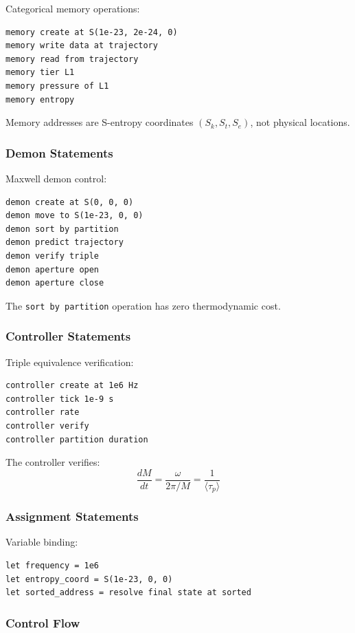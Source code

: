 \documentclass[twocolumn,10pt]{article}
\theoremstyle{definition}
\theoremstyle{remark}
\begin{document}
Categorical memory operations:
\begin{lstlisting}
memory create at S(1e-23, 2e-24, 0)
memory write data at trajectory
memory read from trajectory
memory tier L1
memory pressure of L1
memory entropy
\end{lstlisting}

Memory addresses are S-entropy coordinates $(S_k, S_t, S_e)$, not physical locations.

\subsubsection{Demon Statements}

Maxwell demon control:
\begin{lstlisting}
demon create at S(0, 0, 0)
demon move to S(1e-23, 0, 0)
demon sort by partition
demon predict trajectory
demon verify triple
demon aperture open
demon aperture close
\end{lstlisting}

The \texttt{sort by partition} operation has zero thermodynamic cost.

\subsubsection{Controller Statements}

Triple equivalence verification:
\begin{lstlisting}
controller create at 1e6 Hz
controller tick 1e-9 s
controller rate
controller verify
controller partition duration
\end{lstlisting}

The controller verifies:
\begin{equation}
    \frac{dM}{dt} = \frac{\omega}{2\pi/M} = \frac{1}{\langle \tau_p \rangle}
\end{equation}

\subsubsection{Assignment Statements}

Variable binding:
\begin{lstlisting}
let frequency = 1e6
let entropy_coord = S(1e-23, 0, 0)
let sorted_address = resolve final state at sorted
\end{lstlisting}

\subsubsection{Control Flow}
\end{document}

